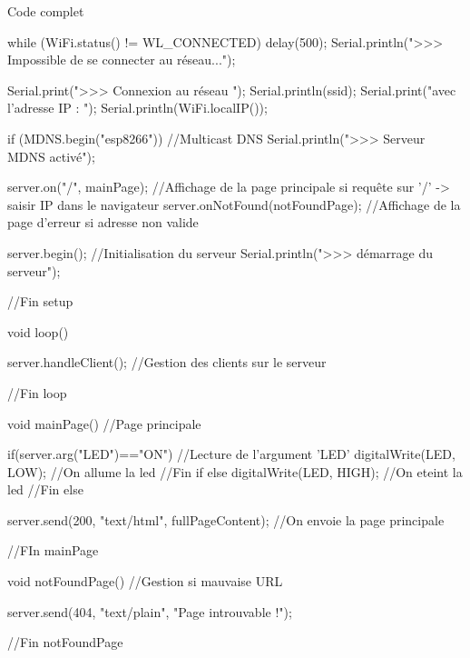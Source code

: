 \begin{Cpp}{Code complet}
{      
    while (WiFi.status() != WL_CONNECTED) 
    {
        delay(500);
        Serial.println(">>> Impossible de se connecter au réseau...");
    }
      
    Serial.print(">>> Connexion au réseau ");
    Serial.println(ssid);
    Serial.print("avec l'adresse IP : ");
    Serial.println(WiFi.localIP());
    
    if (MDNS.begin("esp8266")) {   //Multicast DNS 
        Serial.println(">>> Serveur MDNS activé");
    }
    
    server.on("/", mainPage);           //Affichage de la page principale si requête sur '/' -> saisir IP dans le navigateur
    server.onNotFound(notFoundPage);    //Affichage de la page d'erreur si adresse non valide
    
    server.begin();                     //Initialisation du serveur
    Serial.println(">>> démarrage du serveur");
      
}//Fin setup
    
void loop() 
{
      
    server.handleClient(); //Gestion des clients sur le serveur
     
}//Fin loop
    
    
void mainPage() //Page principale
{ 
    
    if(server.arg("LED")=="ON") //Lecture de l'argument 'LED'
    {
        digitalWrite(LED, LOW); //On allume la led
    }//Fin if
    else 
    {
        digitalWrite(LED, HIGH);   //On eteint la led
    }//Fin else
    
    server.send(200, "text/html", fullPageContent); //On envoie la page principale
      
}//FIn mainPage
    
    
void notFoundPage()  //Gestion si mauvaise URL
{
    server.send(404, "text/plain", "Page introuvable !\n\n");
      
}//Fin notFoundPage

\end{Cpp}